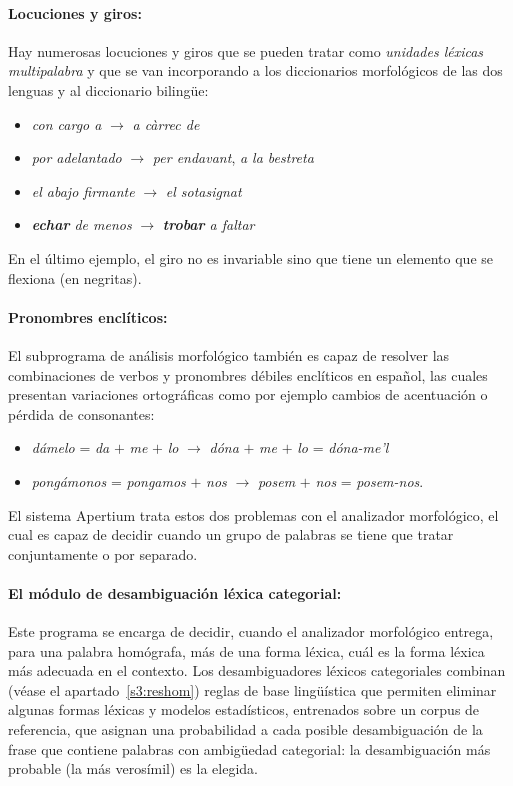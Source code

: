 \paragraph{Locuciones y giros:} Hay numerosas locuciones y giros que se pueden tratar como \emph{unidades léxicas multipalabra} y que se van incorporando a los diccionarios morfológicos de las dos lenguas y al diccionario bilingüe: \begin{itemize} \item \emph{con cargo a} $\rightarrow$ \emph{a càrrec de} \item \emph{por adelantado} $\rightarrow$ \emph{per endavant}, \emph{a la bestreta} \item \emph{el abajo firmante} $\rightarrow$ \emph{el sotasignat} \item \emph{{\bf echar} de menos} $\rightarrow$ \emph{{\bf trobar} a faltar} \end{itemize} En el último ejemplo, el giro no es invariable sino que tiene un elemento que se flexiona (en negritas). 

\paragraph{Pronombres enclíticos:} El subprograma de análisis morfológico también es capaz de resolver las combinaciones de verbos y pronombres débiles enclíticos en español, las cuales presentan variaciones ortográficas como por ejemplo cambios de acentuación o pérdida de consonantes: \begin{itemize} \item \emph{d\'{a}melo} = \emph{da} $+$ \emph{me} $+$ \emph{lo} $\rightarrow$ \emph{dóna} $+$ \emph{me} $+$ \emph{lo} = \emph{dóna-me'l} \item \emph{pong\'{a}monos} = \emph{pongamos} $+$ \emph{nos} $\rightarrow$ {\em posem} $+$ \emph{nos} = \emph{posem-nos}. \end{itemize} 

El sistema Apertium trata estos dos problemas con el analizador morfológico, el cual es capaz de decidir cuando un grupo de palabras se tiene que tratar conjuntamente o por separado. 

\paragraph{El módulo de desambiguación léxica categorial:} Este programa se encarga de decidir, cuando el analizador morfológico entrega, para una palabra homógrafa, más de una forma léxica, cuál es la forma léxica más adecuada en el contexto. Los desambiguadores léxicos categoriales combinan (véase el apartado~\ref{s3:reshom}) reglas de base lingüística que permiten eliminar algunas formas léxicas y modelos estadísticos, entrenados sobre un corpus de referencia, que asignan una probabilidad a cada posible desambiguación de la frase que contiene palabras con ambigüedad categorial: la desambiguación más probable (la más verosímil) es la elegida. 


